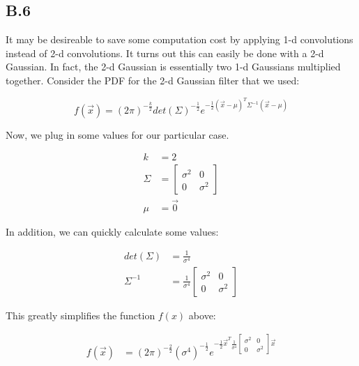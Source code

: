 \documentclass{article}
\begin{document}
\subsection{B.6}

It may be desireable to save some computation cost by applying 1-d convolutions 
instead of 2-d convolutions. It turns out this can easily be done with a 2-d 
Gaussian. In fact, the 2-d Gaussian is essentially two 1-d Gaussians multiplied 
together. Consider the PDF for the 2-d Gaussian filter that we used:

$$
f(\vec{x}) = (2 \pi)^{-\frac{k}{2}} det(\Sigma)^{-\frac{1}{2}} e^{-\frac{1}{2}(\vec{x} - \mu)^T \Sigma^{-1} (\vec{x} - \mu)}
$$

Now, we plug in some values for our particular case.

\begin{align*}
    k      &= 2 \\
    \Sigma &= \begin{bmatrix}
                  \sigma^2 &        0 \\
                         0 & \sigma^2
              \end{bmatrix} \\
    \mu    &= \vec{0}
\end{align*}

In addition, we can quickly calculate some values:

\begin{align*}
    det(\Sigma) &= \frac{1}{\sigma^4} \\
    \Sigma^{-1} &= \frac{1}{\sigma^4} \begin{bmatrix}
                                          \sigma^2 &        0 \\
                                                 0 & \sigma^2
                                      \end{bmatrix}
\end{align*}

This greatly simplifies the function $f(x)$ above:

\begin{align*}
f(\vec{x}) &= (2 \pi)^{-\frac{2}{2}} (\sigma^4)^{-\frac{1}{2}} e^{-\frac{1}{2} \vec{x}^T \frac{1}{\sigma^4} \begin{bmatrix}
            \sigma^2 &        0 \\
                   0 & \sigma^2
        \end{bmatrix} \vec{x}}
\end{align*}
\end{document}

